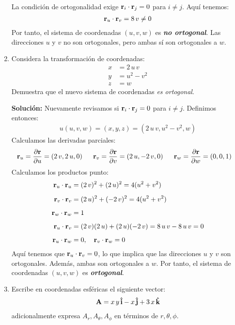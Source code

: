 \documentclass[12pt]{article}
\begin{document}
\begin{enumerate}
\begin{align*}
\end{align*}
La condición de ortogonalidad exige $\vb{r}_{i} \cdot \vb{r}_{j} = 0$ para $i \neq j$. Aquí tenemos:
\begin{align*}
\vb{r}_{u} \cdot \vb{r}_{v} = 8 \, v \neq 0
\end{align*}
Por tanto, el sistema de coordenadas $(u, v, w)$ es \emph{\textbf{no ortogonal}}. Las direcciones $u$ y $v$ no son ortogonales, pero ambas sí son ortogonales a $w$.
\item Considera la transformación de coordenadas:
\begin{align*}
x &= 2 \, u \, v \\[0.5em]
y &= u^{2} - v^{2} \\[0.5em]
z &= w
\end{align*}
Demuestra que el nuevo sistema de coordenadas \emph{es ortogonal}.

\vspace{1cm}
\noindent
\textbf{Solución: } Nuevamente revisamos si $\vb{r}_{i} \cdot \vb{r}_{j} = 0$ para $i \neq j$. Definimos entonces:
\begin{align*}
u (u, v, w) = (x, y, z) = (2 \, u \, v, u^{2} - v^{2}, w)
\end{align*}
Calculamos las derivadas parciales:
\begin{align*}
\vb{r}_{u} &= \pdv{\vb{r}}{u} = \left( 2 \, v, 2 \, u, 0 \right) \hspace{0.5cm} \vb{r}_{v} = \pdv{\vb{r}}{v} = \left( 2 \, u, -2 \, v, 0 \right) \hspace{0.5cm} \vb{r}_{w} = \pdv{\vb{r}}{w} = \left( 0, 0, 1 \right)
\end{align*}
Calculamos los productos punto:
\begin{align*}
\vb{r}_{u} \cdot \vb{r}_{u} &= (2 \, v)^2 + (2 \, u)^2 = 4(u^2 + v^2) \\[0.5em]
\vb{r}_{v} \cdot \vb{r}_{v} &= (2 \, u)^2 + (-2 \, v)^2 = 4(u^2 + v^2) \\[0.5em]
\vb{r}_{w} \cdot \vb{r}_{w} &= 1 \\[0.5em]
\vb{r}_{u} \cdot \vb{r}_{v} &= (2 \, v)(2 \, u) + (2 \, u)(-2 \, v) = 8 \, u \, v - 8 \, u \, v = 0 \\[0.5em]
\vb{r}_{u} \cdot \vb{r}_{w} &= 0, \quad \vb{r}_{v} \cdot \vb{r}_{w} = 0
\end{align*}
Aquí tenemos que $\vb{r}_{u} \cdot \vb{r}_{v} = 0$, lo que implica que las direcciones $u$ y $v$ son ortogonales. Además, ambas son ortogonales a $w$. Por tanto, el sistema de coordenadas $(u, v, w)$ es \emph{\textbf{ortogonal}}.
\item Escribe en coordenadas esféricas el siguiente vector:
\begin{align*}
\vb{A} = x \, y \, \vu{i} - x \, \vu{j} + 3 \, x \, \vu{k}
\end{align*}
adicionalmente expresa $A_{r}, A_{\theta}, A_{\phi}$ en términos de $r, \theta, \phi$.


\end{enumerate}
\end{document}
